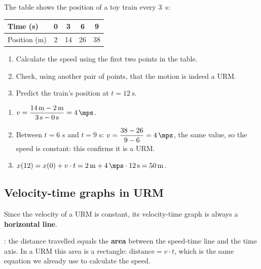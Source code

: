 \begin{exercise}
    The table shows the position of a toy train every \qty{3}{\s}:
    \begin{center}
        \begin{tabular}{lcccc}
            \toprule
            Time (s) & 0 & 3 & 6 & 9 \\
            \midrule
            Position (m) & 2 & 14 & 26 & 38 \\
            \bottomrule
        \end{tabular}
    \end{center}
    \begin{enumerate}[label=\letraminuscula]
        \item Calculate the speed using the first two points in the table.
        \item Check, using another pair of points, that the motion is indeed a URM.
        \item Predict the train's position at \(t=\qty{12}{\s}\).
    \end{enumerate}
    \begin{solu}
        \begin{enumerate}[label=\alph*)]
            \item \(v = \dfrac{\qty{14}{\m} - \qty{2}{\m}}{\qty{3}{\s} - \qty{0}{\s}} = \qty{4}{\mps}\).
            \item Between \(t=6\) s and \(t=9\) s: \(v = \dfrac{38-26}{9-6} = \qty{4}{\mps}\), the same value, so the speed is constant: this confirms it is a URM.
            \item \(x(12) = x(0) + v \cdot t = \qty{2}{\m} + \qty{4}{\mps} \cdot \qty{12}{\s} = \qty{50}{\m}\).
        \end{enumerate}
    \end{solu}
\end{exercise}

\subsection{Velocity-time graphs in URM}

Since the velocity of a URM is constant, its velocity-time graph is always a \textbf{horizontal line}.

\begin{impt}
    : the distance travelled equals the \textbf{area} between the speed-time line and the time axis. In a URM this area is a rectangle: \(\text{distance} = v \cdot t\), which is the same equation we already use to calculate the speed.
\end{impt}

